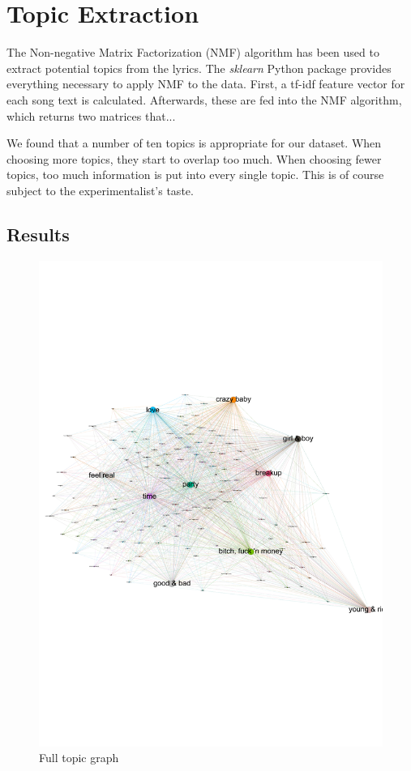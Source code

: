 \documentclass[10pt,a4paper]{article}
\begin{document}
	\section{Topic Extraction}
	\label{sec:topicextraction}
	The Non-negative Matrix Factorization (NMF) algorithm has been used to extract potential topics from the lyrics. The \textit{sklearn} Python package provides everything necessary to apply NMF to the data. First, a tf-idf feature vector for each song text is calculated. Afterwards, these are fed into the NMF algorithm, which returns two matrices that...
	
	We found that a number of ten topics is appropriate for our dataset. When choosing more topics, they start to overlap too much. When choosing fewer topics, too much information is put into every single topic. This is of course subject to the experimentalist's taste.
	
		\subsection{Results}
		
		\begin{figure}[htb]
			\centering
			\includegraphics[trim=0mm 70mm 0mm 50mm, clip, width=\linewidth]{data/topic_graph}
			\caption{Full topic graph}
			\label{fig:topicgraph}
		\end{figure}
		
\end{document}
